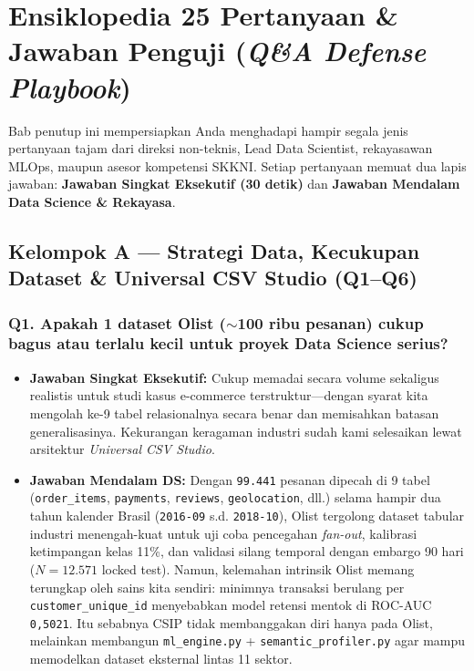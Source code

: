 \documentclass[11pt,a4paper,oneside]{book}
\newcommand{\code}[1]{{\small\nolinkurl{#1}}}
\begin{document}
\chapter{Ensiklopedia 25 Pertanyaan \& Jawaban Penguji (\emph{Q\&A Defense Playbook})}

Bab penutup ini mempersiapkan Anda menghadapi hampir segala jenis pertanyaan tajam dari direksi non-teknis, Lead Data Scientist, rekayasawan MLOps, maupun asesor kompetensi SKKNI. Setiap pertanyaan memuat dua lapis jawaban: \textbf{Jawaban Singkat Eksekutif (30 detik)} dan \textbf{Jawaban Mendalam Data Science \& Rekayasa}.

\section{Kelompok A --- Strategi Data, Kecukupan Dataset \& Universal CSV Studio (Q1--Q6)}

\subsection*{Q1. Apakah 1 dataset Olist ($\sim$100 ribu pesanan) cukup bagus atau terlalu kecil untuk proyek Data Science serius?}
\begin{itemize}
  \item \textbf{Jawaban Singkat Eksekutif:} Cukup memadai secara volume sekaligus realistis untuk studi kasus e-commerce terstruktur---dengan syarat kita mengolah ke-9 tabel relasionalnya secara benar dan memisahkan batasan generalisasinya. Kekurangan keragaman industri sudah kami selesaikan lewat arsitektur \emph{Universal CSV Studio}.
  \item \textbf{Jawaban Mendalam DS:} Dengan \code{99.441} pesanan dipecah di 9 tabel (\code{order_items}, \code{payments}, \code{reviews}, \code{geolocation}, dll.) selama hampir dua tahun kalender Brasil (\code{2016-09} s.d. \code{2018-10}), Olist tergolong dataset tabular industri menengah-kuat untuk uji coba pencegahan \emph{fan-out}, kalibrasi ketimpangan kelas 11\%, dan validasi silang temporal dengan embargo 90 hari ($N=12.571$ locked test). Namun, kelemahan intrinsik Olist memang terungkap oleh sains kita sendiri: minimnya transaksi berulang per \code{customer_unique_id} menyebabkan model retensi mentok di ROC-AUC \code{0,5021}. Itu sebabnya CSIP tidak membanggakan diri hanya pada Olist, melainkan membangun \code{ml_engine.py} + \code{semantic_profiler.py} agar mampu memodelkan dataset eksternal lintas 11 sektor.
\end{itemize}
\end{document}
